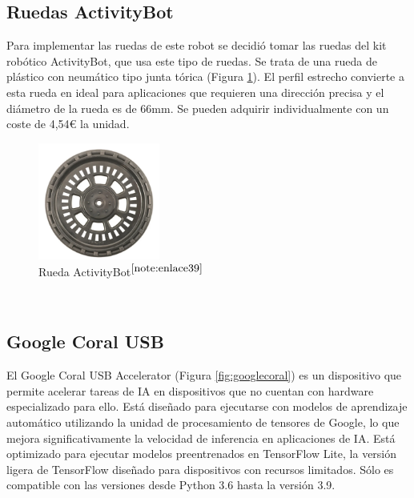 \setcounter{footnote}{38} %



\subsection{Ruedas ActivityBot}

Para implementar las ruedas de este robot se decidió tomar las ruedas del kit robótico ActivityBot, que usa este tipo de ruedas. Se trata de una rueda de plástico con neumático tipo junta tórica (Figura \ref{fig:wheel}). El perfil estrecho convierte a esta rueda en ideal para aplicaciones que requieren una dirección precisa y el diámetro de la rueda es de 66mm. Se pueden adquirir individualmente con un coste de 4,54€ la unidad.

\begin{figure} [h!]
	\begin{center}
		\includegraphics[width=4cm]{figs/wheel.png}
	\end{center}
	\caption{Rueda ActivityBot$^{\ref{note:enlace39}}$} 
\label{fig:wheel}
\end{figure}\

\setcounter{footnote}{39} %

\subsection{Google Coral USB}

El Google Coral USB Accelerator (Figura \ref{fig:googlecoral}) es un dispositivo que permite acelerar tareas de \ac{IA} en dispositivos que no cuentan con hardware especializado para ello. Está diseñado para ejecutarse con modelos de aprendizaje automático utilizando la unidad de procesamiento de tensores de Google, lo que mejora significativamente la velocidad de inferencia en aplicaciones de \acs{IA}. Está optimizado para ejecutar modelos preentrenados en TensorFlow Lite, la versión ligera de TensorFlow diseñado para dispositivos con recursos limitados. Sólo es compatible con  las versiones desde Python 3.6 hasta la versión 3.9.

